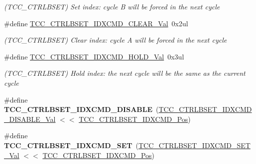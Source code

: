 \begin{DoxyCompactItemize}
\begin{DoxyCompactList}\small\item\em (T\+C\+C\+\_\+\+C\+T\+R\+L\+B\+S\+E\+T) Set index\+: cycle B will be forced in the next cycle \end{DoxyCompactList}\item 
\hypertarget{group___s_a_m_l21___t_c_c_ga31ec8f2cf2a8ad4b3097d7d379c96a27}{}\#define \hyperlink{group___s_a_m_l21___t_c_c_ga31ec8f2cf2a8ad4b3097d7d379c96a27}{T\+C\+C\+\_\+\+C\+T\+R\+L\+B\+S\+E\+T\+\_\+\+I\+D\+X\+C\+M\+D\+\_\+\+C\+L\+E\+A\+R\+\_\+\+Val}~0x2ul\label{group___s_a_m_l21___t_c_c_ga31ec8f2cf2a8ad4b3097d7d379c96a27}

\begin{DoxyCompactList}\small\item\em (T\+C\+C\+\_\+\+C\+T\+R\+L\+B\+S\+E\+T) Clear index\+: cycle A will be forced in the next cycle \end{DoxyCompactList}\item 
\hypertarget{group___s_a_m_l21___t_c_c_ga890a09b5254cd8ce68584c6c6c358830}{}\#define \hyperlink{group___s_a_m_l21___t_c_c_ga890a09b5254cd8ce68584c6c6c358830}{T\+C\+C\+\_\+\+C\+T\+R\+L\+B\+S\+E\+T\+\_\+\+I\+D\+X\+C\+M\+D\+\_\+\+H\+O\+L\+D\+\_\+\+Val}~0x3ul\label{group___s_a_m_l21___t_c_c_ga890a09b5254cd8ce68584c6c6c358830}

\begin{DoxyCompactList}\small\item\em (T\+C\+C\+\_\+\+C\+T\+R\+L\+B\+S\+E\+T) Hold index\+: the next cycle will be the same as the current cycle \end{DoxyCompactList}\item 
\hypertarget{group___s_a_m_l21___t_c_c_ga28694ea78d2c4f768e6f9749ed82f58c}{}\#define {\bfseries T\+C\+C\+\_\+\+C\+T\+R\+L\+B\+S\+E\+T\+\_\+\+I\+D\+X\+C\+M\+D\+\_\+\+D\+I\+S\+A\+B\+L\+E}~(\hyperlink{group___s_a_m_l21___t_c_c_ga3113b66d22bc9182c8ba47fa573c4c94}{T\+C\+C\+\_\+\+C\+T\+R\+L\+B\+S\+E\+T\+\_\+\+I\+D\+X\+C\+M\+D\+\_\+\+D\+I\+S\+A\+B\+L\+E\+\_\+\+Val} $<$$<$ \hyperlink{group___s_a_m_l21___t_c_c_gad1a19b5640a5a4f1da6cd99bf0f2cfcd}{T\+C\+C\+\_\+\+C\+T\+R\+L\+B\+S\+E\+T\+\_\+\+I\+D\+X\+C\+M\+D\+\_\+\+Pos})\label{group___s_a_m_l21___t_c_c_ga28694ea78d2c4f768e6f9749ed82f58c}

\item 
\hypertarget{group___s_a_m_l21___t_c_c_gac05d276c5b01a9df152a57284b05ae6a}{}\#define {\bfseries T\+C\+C\+\_\+\+C\+T\+R\+L\+B\+S\+E\+T\+\_\+\+I\+D\+X\+C\+M\+D\+\_\+\+S\+E\+T}~(\hyperlink{group___s_a_m_l21___t_c_c_gac1e67bc915ada5b5c8f1b030ea84d130}{T\+C\+C\+\_\+\+C\+T\+R\+L\+B\+S\+E\+T\+\_\+\+I\+D\+X\+C\+M\+D\+\_\+\+S\+E\+T\+\_\+\+Val}   $<$$<$ \hyperlink{group___s_a_m_l21___t_c_c_gad1a19b5640a5a4f1da6cd99bf0f2cfcd}{T\+C\+C\+\_\+\+C\+T\+R\+L\+B\+S\+E\+T\+\_\+\+I\+D\+X\+C\+M\+D\+\_\+\+Pos})\label{group___s_a_m_l21___t_c_c_gac05d276c5b01a9df152a57284b05ae6a}


\end{DoxyCompactItemize}
